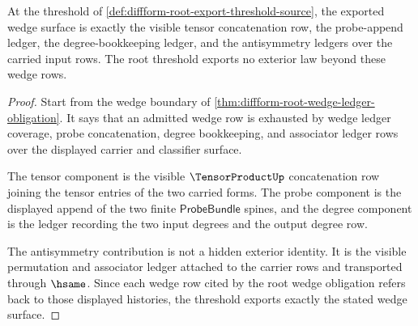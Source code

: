 \begin{theorem}
\label{thm:diffform-root-export-wedge-threshold}
At the threshold of \autoref{def:diffform-root-export-threshold-source}, the
exported wedge surface is exactly the visible tensor concatenation row, the
probe-append ledger, the degree-bookkeeping ledger, and the antisymmetry
ledgers over the carried input rows. The root threshold exports no exterior
law beyond these wedge rows.
\end{theorem}
\begin{proof}
Start from the wedge boundary of
\autoref{thm:diffform-root-wedge-ledger-obligation}. It says that an admitted
wedge row is exhausted by wedge ledger coverage, probe concatenation,
degree bookkeeping, and associator ledger rows over the displayed carrier and
classifier surface.

The tensor component is the visible $\TensorProductUp$ concatenation row
joining the tensor entries of the two carried forms. The probe component is
the displayed append of the two finite $\mathsf{ProbeBundle}$ spines, and the
degree component is the ledger recording the two input degrees and the output
degree row.

The antisymmetry contribution is not a hidden exterior identity. It is the
visible permutation and associator ledger attached to the carrier rows and
transported through $\hsame$. Since each wedge row cited by the root wedge
obligation refers back to those displayed histories, the threshold exports
exactly the stated wedge surface.
\end{proof}

